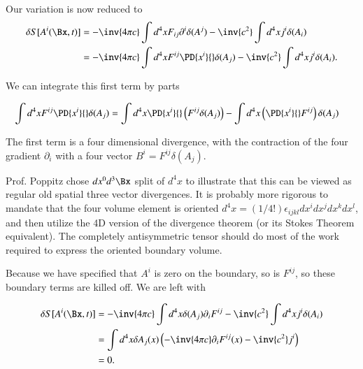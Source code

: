 Our variation is now reduced to
\begin{align*}
\delta S[A^i(\Bx, t)]
&= -\inv{4 \pi c} \int d^4 x F_{ij} \partial^i \delta(A^j) - \inv{c^2} \int d^4 x j^i \delta(A_i) \\
&= -\inv{4 \pi c} \int d^4 x F^{ij} \PD{x^i}{} \delta(A_j) - \inv{c^2} \int d^4 x j^i \delta(A_i).
\end{align*}

We can integrate this first term by parts

\begin{align*}
\int d^4 x F^{ij} \PD{x^i}{} \delta(A_j)
&=
\int d^4 x \PD{x^i}{} \left( F^{ij} \delta(A_j) \right)
-\int d^4 x \left( \PD{x^i}{} F^{ij} \right) \delta(A_j) 
\end{align*}

The first term is a four dimensional divergence, with the contraction of the four gradient $\partial_i$ with a four vector $B^i = F^{ij} \delta(A_j)$.

Prof. Poppitz chose $dx^0 d^3 \Bx$ split of $d^4 x$ to illustrate that this can be viewed as regular old spatial three vector divergences.  It is probably more rigorous to mandate that the four volume element is oriented $d^4 x = (1/4!)\epsilon_{ijkl} dx^i dx^j dx^k dx^l$, and then utilize the 4D version of the divergence theorem (or its Stokes Theorem equivalent).  The completely antisymmetric tensor should do most of the work required to express the oriented boundary volume.


Because we have specified that $A^i$ is zero on the boundary, so is $F^{ij}$, so these boundary terms are killed off.  We are left with

\begin{align*}
\delta S[A^i(\Bx, t)]
&= -\inv{4 \pi c} \int d^4 x \delta (A_j) \partial_i F^{ij} - \inv{c^2} \int d^4 x j^i \delta(A_i) \\
&=
\int d^4 x \delta A_j(x)
\left(
-\inv{4 \pi c} \partial_i F^{ij}(x) - \inv{c^2} j^i
\right)  \\
&= 0.
\end{align*}

